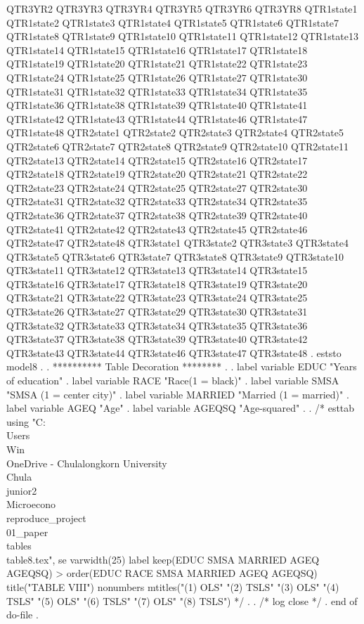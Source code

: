                QTR3YR2 QTR3YR3 QTR3YR4 QTR3YR5 QTR3YR6 QTR3YR8 QTR1state1
               QTR1state2 QTR1state3 QTR1state4 QTR1state5 QTR1state6
               QTR1state7 QTR1state8 QTR1state9 QTR1state10 QTR1state11
               QTR1state12 QTR1state13 QTR1state14 QTR1state15 QTR1state16
               QTR1state17 QTR1state18 QTR1state19 QTR1state20 QTR1state21
               QTR1state22 QTR1state23 QTR1state24 QTR1state25 QTR1state26
               QTR1state27 QTR1state30 QTR1state31 QTR1state32 QTR1state33
               QTR1state34 QTR1state35 QTR1state36 QTR1state38 QTR1state39
               QTR1state40 QTR1state41 QTR1state42 QTR1state43 QTR1state44
               QTR1state46 QTR1state47 QTR1state48 QTR2state1 QTR2state2
               QTR2state3 QTR2state4 QTR2state5 QTR2state6 QTR2state7
               QTR2state8 QTR2state9 QTR2state10 QTR2state11 QTR2state13
               QTR2state14 QTR2state15 QTR2state16 QTR2state17 QTR2state18
               QTR2state19 QTR2state20 QTR2state21 QTR2state22 QTR2state23
               QTR2state24 QTR2state25 QTR2state27 QTR2state30 QTR2state31
               QTR2state32 QTR2state33 QTR2state34 QTR2state35 QTR2state36
               QTR2state37 QTR2state38 QTR2state39 QTR2state40 QTR2state41
               QTR2state42 QTR2state43 QTR2state45 QTR2state46 QTR2state47
               QTR2state48 QTR3state1 QTR3state2 QTR3state3 QTR3state4
               QTR3state5 QTR3state6 QTR3state7 QTR3state8 QTR3state9
               QTR3state10 QTR3state11 QTR3state12 QTR3state13 QTR3state14
               QTR3state15 QTR3state16 QTR3state17 QTR3state18 QTR3state19
               QTR3state20 QTR3state21 QTR3state22 QTR3state23 QTR3state24
               QTR3state25 QTR3state26 QTR3state27 QTR3state29 QTR3state30
               QTR3state31 QTR3state32 QTR3state33 QTR3state34 QTR3state35
               QTR3state36 QTR3state37 QTR3state38 QTR3state39 QTR3state40
               QTR3state42 QTR3state43 QTR3state44 QTR3state46 QTR3state47
               QTR3state48
{\smallskip}
. eststo model8
{\smallskip}
. 
. **********  Table Decoration ********
. 
. label variable EDUC   "Years of education"
{\smallskip}
. label variable RACE   "Race(1 = black)"
{\smallskip}
. label variable SMSA   "SMSA (1 = center city)"
{\smallskip}
. label variable MARRIED   "Married (1 = married)"
{\smallskip}
. label variable AGEQ   "Age"
{\smallskip}
. label variable AGEQSQ   "Age-squared"
{\smallskip}
. 
. /* esttab using "C:\\Users\\Win\\OneDrive - Chulalongkorn University\\Chula\\junior2\\Microecono\\reproduce_project\\01_paper\\tables\\table8.tex", se varwidth(25) label keep(EDUC SMSA MARRIED AGEQ AGEQSQ) 
> order(EDUC RACE SMSA MARRIED AGEQ AGEQSQ) title("TABLE VIII") nonumbers mtitles("(1) OLS" "(2) TSLS" "(3) OLS" "(4) TSLS" "(5) OLS" "(6) TSLS" "(7) OLS" "(8) TSLS") */
. 
. /* log close */
. 
end of do-file
{\smallskip}
. 
